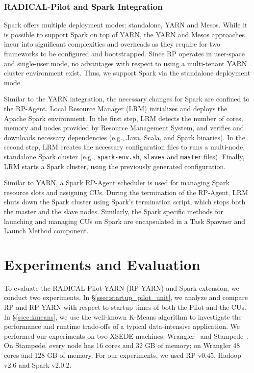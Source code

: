 \subsubsection*{RADICAL-Pilot and Spark Integration}
\label{sssec:rp_spark}

Spark offers multiple deployment modes: standalone, YARN and Mesos. While it is
possible to support Spark on top of YARN, the YARN and Mesos approaches incur
into significant complexities and overheads as they require for two frameworks
to be configured and bootstrapped. Since RP operates in user-space
and single-user mode, no advantages with respect to using a multi-tenant YARN
cluster environment exist. Thus, we support Spark via the standalone deployment
mode.

Similar to the YARN integration, the necessary changes for Spark are confined to
the RP-Agent. Local Resource Manager (LRM) initializes and deploys
the Apache Spark environment. In the first step, LRM detects the number of
cores, memory and nodes provided by Resource Management System, and verifies and
downloads necessary dependencies (e.g., Java, Scala, and Spark binaries). In the
second step, LRM creates the necessary configuration files to runs a multi-node,
standalone Spark cluster (e.g., \texttt{spark-env.sh}, \texttt{slaves} and
\texttt{master} files). Finally, LRM starts a Spark cluster, using the
previously generated configuration.

Similar to YARN, a Spark RP-Agent scheduler is used
for managing Spark resource slots and assigning CUs. During the termination of
the RP-Agent, LRM shuts down the Spark cluster using
Spark’s termination script, which stops both the master and the slave nodes.
Similarly, the Spark specific methods for launching and managing CUs
on Spark are encapsulated in a Task Spawner and Launch Method component.

\section{Experiments and Evaluation}
\label{sec:rph-exps}

To evaluate the RADICAL-Pilot-YARN (RP-YARN) and Spark extension, we conduct two
experiments. In \S\ref{ssec:startup_pilot_unit}, we analyze and compare
RP and RP-YARN with respect to startup times of both the
Pilot and the CUs. In \S\ref{ssec:kmeans}, we use the well-known
K-Means algorithm to investigate the performance and runtime trade-offs of a
typical data-intensive application. We performed our experiments on two XSEDE
machines: Wrangler~\cite{wrangler} and Stampede~\cite{stampede}. On Stampede,
every node has 16 cores and 32 GB of memory; on Wrangler 48 cores and 128 GB of
memory. For our experiments, we used RP v0.45, Hadoop v2.6 and Spark
v2.0.2.

